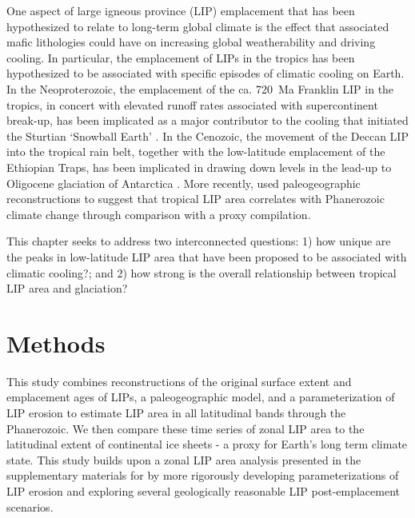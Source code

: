 One aspect of large igneous province (LIP) emplacement that has been hypothesized to relate to long-term global climate is the effect that associated mafic lithologies could have on increasing global weatherability and driving cooling. In particular, the emplacement of LIPs in the tropics has been hypothesized to be associated with specific episodes of climatic cooling on Earth. In the Neoproterozoic, the emplacement of the ca. 720~Ma Franklin LIP in the tropics, in concert with elevated runoff rates associated with supercontinent break-up, has been implicated as a major contributor to the cooling that initiated the Sturtian `Snowball Earth' \citep{Donnadieu2004b, Macdonald2010a, Cox2016a}. In the Cenozoic, the movement of the Deccan LIP into the tropical rain belt, together with the low-latitude emplacement of the Ethiopian Traps, has been implicated in drawing down \COtwo levels in the lead-up to Oligocene glaciation of Antarctica \citep{Kent2008a, Kent2013a}. More recently, \citet{Johansson2018a} used paleogeographic reconstructions to suggest that tropical LIP area correlates with Phanerozoic climate change through comparison with a \pCOtwo proxy compilation.

This chapter seeks to address two interconnected questions: 1) how unique are the peaks in low-latitude LIP area that have been proposed to be associated with climatic cooling?; and 2) how strong is the overall relationship between tropical LIP area and glaciation?

\section{Methods}

This study combines reconstructions of the original surface extent and emplacement ages of LIPs, a paleogeographic model, and a parameterization of LIP erosion to estimate LIP area in all latitudinal bands through the Phanerozoic. We then compare these time series of zonal LIP area to the latitudinal extent of continental ice sheets - a proxy for Earth's long term climate state. This study builds upon a zonal LIP area analysis presented in the supplementary materials for \citet{Macdonald2019a} by more rigorously developing parameterizations of LIP erosion and exploring several geologically reasonable LIP post-emplacement scenarios.

